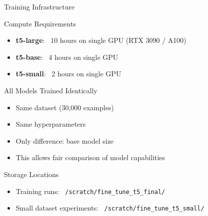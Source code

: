 \begin{frame}{Training Infrastructure}
\begin{block}{Compute Requirements}
\begin{itemize}
  \item \textbf{t5-large}: ~10 hours on single GPU (RTX 3090 / A100)
  \item \textbf{t5-base}: ~4 hours on single GPU
  \item \textbf{t5-small}: ~2 hours on single GPU
\end{itemize}
\end{block}

\begin{block}{All Models Trained Identically}
\begin{itemize}
  \item Same dataset (30,000 examples)
  \item Same hyperparameters
  \item Only difference: base model size
  \item This allows fair comparison of model capabilities
\end{itemize}
\end{block}

\begin{block}{Storage Locations}
\begin{itemize}
  \item Training runs: \texttt{~/scratch/fine\_tune\_t5\_final/}
  \item Small dataset experiments: \texttt{~/scratch/fine\_tune\_t5\_small/}
\end{itemize}
\end{block}
\end{frame}

